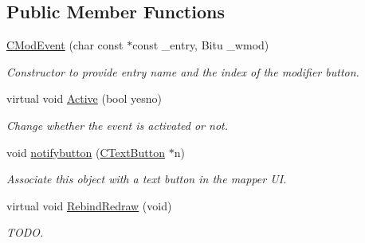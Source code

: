 \subsection*{Public Member Functions}
\begin{DoxyCompactItemize}
\item 
\hypertarget{classCModEvent_a1bf7b8ec974c1944dbfa3737cac5e426}{\hyperlink{classCModEvent_a1bf7b8ec974c1944dbfa3737cac5e426}{C\-Mod\-Event} (char const $\ast$const \-\_\-entry, Bitu \-\_\-wmod)}\label{classCModEvent_a1bf7b8ec974c1944dbfa3737cac5e426}

\begin{DoxyCompactList}\small\item\em Constructor to provide entry name and the index of the modifier button. \end{DoxyCompactList}\item 
\hypertarget{classCModEvent_a682d2590a915ef555a9f2c2d6aa927c8}{virtual void \hyperlink{classCModEvent_a682d2590a915ef555a9f2c2d6aa927c8}{Active} (bool yesno)}\label{classCModEvent_a682d2590a915ef555a9f2c2d6aa927c8}

\begin{DoxyCompactList}\small\item\em Change whether the event is activated or not. \end{DoxyCompactList}\item 
\hypertarget{classCModEvent_a20aea0373f707e3c8f047f6e52bf5f77}{void \hyperlink{classCModEvent_a20aea0373f707e3c8f047f6e52bf5f77}{notifybutton} (\hyperlink{classCTextButton}{C\-Text\-Button} $\ast$n)}\label{classCModEvent_a20aea0373f707e3c8f047f6e52bf5f77}

\begin{DoxyCompactList}\small\item\em Associate this object with a text button in the mapper U\-I. \end{DoxyCompactList}\item 
\hypertarget{classCModEvent_af73297c2595c5f031446dcc6d63d4c6e}{virtual void \hyperlink{classCModEvent_af73297c2595c5f031446dcc6d63d4c6e}{Rebind\-Redraw} (void)}\label{classCModEvent_af73297c2595c5f031446dcc6d63d4c6e}

\begin{DoxyCompactList}\small\item\em T\-O\-D\-O. \end{DoxyCompactList}\end{DoxyCompactItemize}
